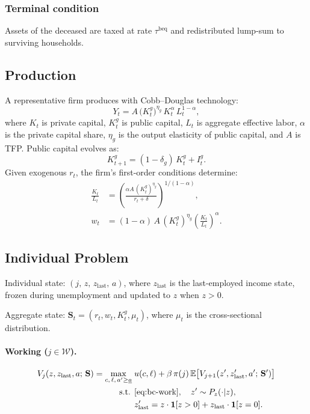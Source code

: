 \subsubsection*{Terminal condition}
Assets of the deceased are taxed at rate $\tau^{\text{beq}}$ and redistributed lump-sum to surviving households.

\subsection{Production}
A representative firm produces with Cobb--Douglas technology:
\begin{equation}\label{eq:production}
Y_t = A\,\bigl(K_t^g\bigr)^{\eta_g}\,K_t^{\alpha}\,L_t^{1-\alpha},
\end{equation}
where $K_t$ is private capital, $K_t^g$ is public capital, $L_t$ is aggregate effective labor, $\alpha$ is the private capital share, $\eta_g$ is the output elasticity of public capital, and $A$ is TFP. Public capital evolves as:
\begin{equation}\label{eq:kg}
K_{t+1}^g = (1-\delta_g)\,K_t^g + I_t^g.
\end{equation}
Given exogenous $r_t$, the firm's first-order conditions determine:
\begin{align}
\frac{K_t}{L_t} &= \left(\frac{\alpha A\,(K_t^g)^{\eta_g}}{r_t+\delta}\right)^{1/(1-\alpha)}, \label{eq:foc-k}\\
w_t &= (1-\alpha)\,A\,(K_t^g)^{\eta_g}\left(\frac{K_t}{L_t}\right)^{\alpha}. \label{eq:foc-w}
\end{align}

\subsection{Individual Problem}\label{sec:state}
Individual state: $(j,\, z,\, z_{\text{last}},\, a)$, where $z_{\text{last}}$ is the last-employed income state, frozen during unemployment and updated to $z$ when $z>0$.

Aggregate state: $\mathbf{S}_t = (r_t, w_t, K_t^g, \mu_t)$, where $\mu_t$ is the cross-sectional distribution.

\paragraph{Working ($j \in \mathcal{W}$).}
\begin{align*}
V_j(z, z_{\text{last}}, a;\,\mathbf{S}) = \max_{c,\,\ell,\,a' \geq \underline{a}} \;& u(c,\ell) + \beta\,\pi(j)\,\mathbb{E}\bigl[V_{j+1}(z', z_{\text{last}}', a';\,\mathbf{S}')\bigr] \\
\text{s.t. } & \eqref{eq:bc-work}, \quad z' \sim P_z(\cdot|z), \\
& z_{\text{last}}' = z \cdot \mathbf{1}[z>0] + z_{\text{last}} \cdot \mathbf{1}[z=0].
\end{align*}

